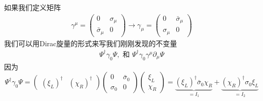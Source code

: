 如果我们定义矩阵
\begin{align}
\gamma^\mu=\left(\begin{matrix}0&\sigma_\mu\\\bar\sigma_\mu&0\end{matrix}\right)\to\gamma_\mu=\left(\begin{matrix}0&\bar\sigma_\mu\\\sigma_\mu&0\end{matrix}\right)
\end{align}
我们可以用Dirac旋量的形式来写我们刚刚发现的不变量
\begin{align}
\Psi^\dagger\gamma_0\Psi,\text{\ \ 和\ \ }\Psi^\dagger\gamma_0\gamma^\mu\partial_\mu\Psi
\end{align}
因为
\[\Psi^\dagger\gamma_0\Psi=\left(\begin{matrix}(\xi_L)^\dagger&(\chi_R)^\dagger\end{matrix}\right) \left(\begin{matrix}0&\bar\sigma_0\\\sigma_0&0\end{matrix}\right) \left(\begin{matrix}\xi_L\\\chi_R\end{matrix}\right) = \underbrace{(\xi_L)^\dagger\bar\sigma_0\chi_R}_{=I_1}+\underbrace{(\chi_R)^\dagger\sigma_0\xi_L}_{=I_2} \]
